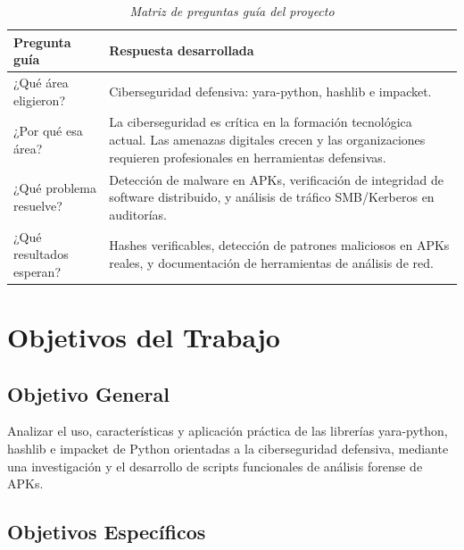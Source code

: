 \documentclass[12pt,a4paper]{article}
\begin{document}
\begin{table}[H]
\centering
\begin{threeparttable}
\caption{\textit{Matriz de preguntas guía del proyecto}}
\begin{tabular}{p{4.5cm}p{8cm}}
\toprule
\textbf{Pregunta guía} & \textbf{Respuesta desarrollada} \\
\midrule
¿Qué área eligieron? & Ciberseguridad defensiva: yara-python, hashlib e impacket. \\
¿Por qué esa área? & La ciberseguridad es crítica en la formación tecnológica actual. Las amenazas digitales crecen y las organizaciones requieren profesionales en herramientas defensivas. \\
¿Qué problema resuelve? & Detección de malware en APKs, verificación de integridad de software distribuido, y análisis de tráfico SMB/Kerberos en auditorías. \\
¿Qué resultados esperan? & Hashes verificables, detección de patrones maliciosos en APKs reales, y documentación de herramientas de análisis de red. \\
\bottomrule
\end{tabular}
\end{threeparttable}
\end{table}

\section{Objetivos del Trabajo}

\subsection{Objetivo General}

Analizar el uso, características y aplicación práctica de las librerías
yara-python, hashlib e impacket de Python orientadas a la ciberseguridad
defensiva, mediante una investigación y el desarrollo de
scripts funcionales de análisis forense de APKs.

\subsection{Objetivos Específicos}
\end{document}
